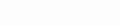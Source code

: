 \documentclass[
 9pt,
  border=2,
  convert={
    density=150, %
    outext=.png
  },
]{standalone}
\begin{document}
\small
$\displaystyle 
\color{white}
\sin z = -i \sinh i z.
$
\end{document}
